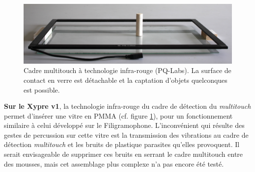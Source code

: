 \begin{figure}[!htbp]
	\captionsetup{format=plain}%
	\includegraphics[width=\textwidth]{gfx/05_interfaces/PQlabs-G4overlay.jpg}
	\caption[Cadre multitouch à technologie infra-rouge]{Cadre multitouch à technologie infra-rouge (PQ-Labs). La surface de contact en verre est détachable et la captation d'objets quelconques est possible.}
	\label{fig:interface:PQlabs-G4overlay}
\end{figure}

\indent \textbf{Sur le Xypre v1}, la technologie infra-rouge du cadre de détection du \textit{multitouch} permet d'insérer une vitre en \gls{PMMA} (cf. figure \ref{fig:interface:PQlabs-G4overlay}), pour un fonctionnement similaire à celui développé sur le Filigramophone. L'inconvénient qui résulte des gestes de percussion sur cette vitre est la transmission des vibrations au cadre de détection \textit{multitouch} et les bruits de plastique parasites qu'elles provoquent. Il serait envisageable de supprimer ces bruits en serrant le cadre multitouch entre des mousses, mais cet assemblage plus complexe n'a pas encore été testé.

